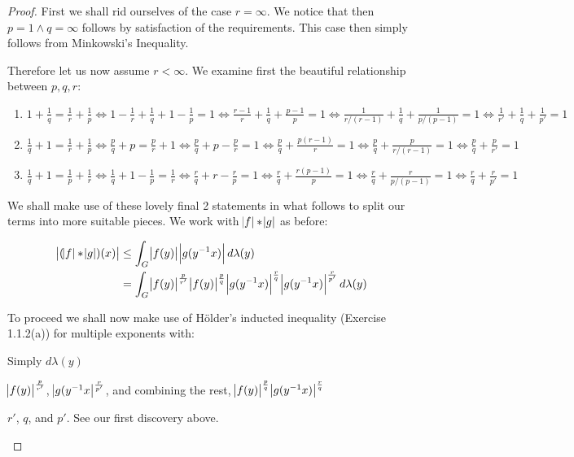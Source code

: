 \begin{proof}
First we shall rid ourselves of the case $r = \infty$. We notice that then $ p = 1 \wedge q = \infty $ follows by satisfaction of the requirements. This case then simply follows from Minkowski's Inequality.

Therefore let us now assume $ r < \infty$. We examine first the beautiful relationship between $p,q,r$:

\begin{enumerate}
\item $1+\frac{1}{q} = \frac{1}{r}+\frac{1}{p} \Leftrightarrow 1-\frac{1}{r}+\frac{1}{q}+1-\frac{1}{p} = 1 \Leftrightarrow \frac{r-1}{r}+\frac{1}{q}+\frac{p-1}{p}=1 \Leftrightarrow \frac{1}{r/(r-1)}+\frac{1}{q}+\frac{1}{p/(p-1)}=1 \Leftrightarrow \frac{1}{r'}+\frac{1}{q}+\frac{1}{p'} =1$
\item $ \frac{1}{q}+1=\frac{1}{r}+\frac{1}{p} \Leftrightarrow \frac{p}{q}+p=\frac{p}{r}+1 \Leftrightarrow \frac{p}{q}+p-\frac{p}{r}=1 \Leftrightarrow \frac{p}{q}+\frac{p(r-1)}{r}=1 \Leftrightarrow \frac{p}{q}+\frac{p}{r/(r-1)}=1 \Leftrightarrow \frac{p}{q}+\frac{p}{r'}=1$
\item $ \frac{1}{q}+1 = \frac{1}{p}+\frac{1}{r} \Leftrightarrow \frac{1}{q}+1-\frac{1}{p}=\frac{1}{r} \Leftrightarrow \frac{r}{q}+r-\frac{r}{p}=1 \Leftrightarrow \frac{r}{q}+\frac{r(p-1)}{p}=1 \Leftrightarrow \frac{r}{q}+\frac{r}{p/(p-1)}=1 \Leftrightarrow \frac{r}{q}+\frac{r}{p'}=1$
\end{enumerate}
We shall make use of these lovely final 2 statements in what follows to split our terms into more suitable pieces. We work with $\abs{f} \ast \abs{g}$ as before:

\begin{align*}
\abs{(\abs{f}\ast \abs{g})(x)} &\leq \int_G \abs{f(y)}\abs{g(y^{-1}x)} d\lambda(y) \\
&= \int_G \abs{f(y)}^\frac{p}{r'}\abs{f(y)}^\frac{p}{q}\abs{g(y^{-1}x)}^\frac{r}{q}\abs{g(y^{-1}x)}^\frac{r}{p'} d\lambda(y)
\end{align*}

To proceed we shall now make use of H\"older's inducted inequality (Exercise 1.1.2(a)) for multiple exponents  with:
\begin{description}
[align=right,labelwidth=3cm]
\item [Measure] Simply $d\lambda(y)$
\item [Functions] $\abs{f(y)}^\frac{p}{r'}$, $\abs{g(y^{-1}x}^\frac{r}{p'}$, and combining the rest, $\abs{f(y)}^\frac{p}{q}\abs{g(y^{-1}x)}^\frac{r}{q}$
\item [Exponents] $r'$, $q$, and $p'$. See our first discovery above.
\end{description}
\end{proof}


